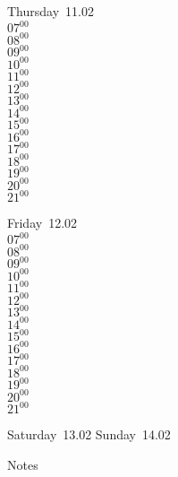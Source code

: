 \documentclass[11pt,a4paper]{book}\usepackage[]{graphicx}\usepackage[]{color}
\begin{document}
\clearpage
\begin{headerbox}
\end{headerbox}
\begin{weekdaybox}
  Thursday~11.02\\
  { 
  \vfill
  $07^{00}$\\
$08^{00}$\\
$09^{00}$\\
$10^{00}$\\
$11^{00}$\\
$12^{00}$\\
$13^{00}$\\
$14^{00}$\\
$15^{00}$\\
$16^{00}$\\
$17^{00}$\\
$18^{00}$\\
$19^{00}$\\
$20^{00}$\\
$21^{00}$\\
  }
\end{weekdaybox} 
\begin{weekdaybox}
  Friday~12.02\\
  { 
  \vfill
  $07^{00}$\\
$08^{00}$\\
$09^{00}$\\
$10^{00}$\\
$11^{00}$\\
$12^{00}$\\
$13^{00}$\\
$14^{00}$\\
$15^{00}$\\
$16^{00}$\\
$17^{00}$\\
$18^{00}$\\
$19^{00}$\\
$20^{00}$\\
$21^{00}$\\
  }
\end{weekdaybox}
\begin{weekendbox}
  Saturday~13.02
  \tcblower
  Sunday~14.02
\end{weekendbox} %
\begin{notebox}
  Notes
\end{notebox}
\clearpage
\end{document}
